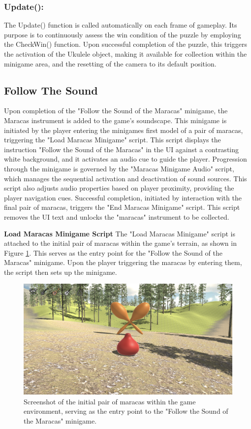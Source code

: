 \documentclass{l4proj}
\begin{document}
\subsubsection{Update():} The Update() function is called automatically on each frame of gameplay. Its purpose is to continuously assess the win condition of the puzzle by employing the CheckWin() function. Upon successful completion of the puzzle, this triggers the activation of the Ukulele object, making it available for collection within the minigame area, and the resetting of the camera to its default position.

\subsection{Follow The Sound}
Upon completion of the "Follow the Sound of the Maracas" minigame, the Maracas instrument is added to the game's soundscape. This minigame is initiated by the player entering the minigames first model of a pair of maracas, triggering the "Load Maracas Minigame" script. This script displays the instruction "Follow the Sound of the Maracas" in the UI against a contrasting white background, and it activates an audio cue to guide the player. Progression through the minigame is governed by the "Maracas Minigame Audio" script, which manages the sequential activation and deactivation of sound sources. This script also adjusts audio properties based on player proximity, providing the player navigation cues. Successful completion, initiated by interaction with the final pair of maracas, triggers the "End Maracas Minigame" script. This script removes the UI text and unlocks the "maracas" instrument to be collected.
\newline

\textbf{Load Maracas Minigame Script} \newline
The "Load Maracas Minigame" script is attached to the initial pair of maracas within the game's terrain, as shown in Figure \ref{fig:maracas_trigger}. This serves as the entry point for the "Follow the Sound of the Maracas" minigame. Upon the player triggering the maracas by entering them, the script then sets up the minigame.

\begin{figure}[h]
 \centering
 \includegraphics[width=0.7\linewidth]{dissertation/images/Maracas_Trigger.png} 
 \caption{Screenshot of the initial pair of maracas within the game environment, serving as the entry point to the "Follow the Sound of the Maracas" minigame.} 
 \label{fig:maracas_trigger} 
\end{figure}
\end{document}
